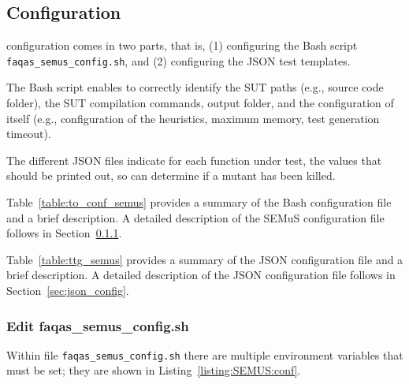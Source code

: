 \subsection{\SEMUS Configuration}

\SEMUS configuration comes in two parts, that is, (1) configuring the Bash script \texttt{faqas\_semus\_config.sh}, and (2) configuring the JSON test templates.


The Bash script enables \SEMUS to correctly identify the SUT paths (e.g., source code folder), the SUT compilation commands, output folder, and the configuration of \SEMUS itself (e.g., configuration of the heuristics, maximum memory, test generation timeout). 

The different JSON files indicate for each function under test, the values that should be printed out, so \SEMUS can determine if a mutant has been killed.



Table~\ref{table:to_conf_semus} provides a summary of the Bash \SEMUS configuration file and a brief description. A detailed description of the SEMuS configuration file follows in Section~\ref{sec:semus_config}.



Table~\ref{table:ttg_semus} provides a summary of the JSON \SEMUS configuration file and a brief description. A detailed description of the JSON configuration file follows in Section~\ref{sec:json_config}.


\subsubsection{Edit faqas\_semus\_config.sh}
\label{sec:semus_config}

Within file \texttt{faqas\_semus\_config.sh} there are multiple environment variables that must be set; they are shown in Listing~\ref{listing:SEMUS:conf}.


